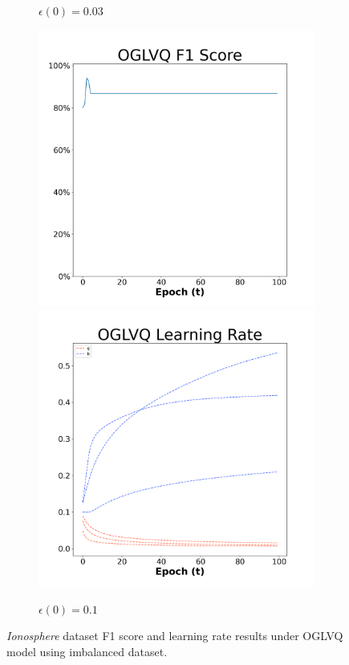 \begin{figure}[H]
\begin{subfigure}{0.3\textwidth}
  \caption{$\epsilon(0)=0.03$}
\end{subfigure}\hfil %
\begin{subfigure}{0.3\textwidth}
  \includegraphics[width=\linewidth]{images/exper2/Ionosphere/OGLVQ_0.1_f1.png}
  \includegraphics[width=\linewidth]{images/exper2/Ionosphere/OGLVQ_0.1_lr.png}
  \caption{$\epsilon(0)=0.1$}
\end{subfigure}

\caption{\textit{Ionosphere} dataset F1 score and learning rate results under OGLVQ model using imbalanced dataset.}
\end{figure}


